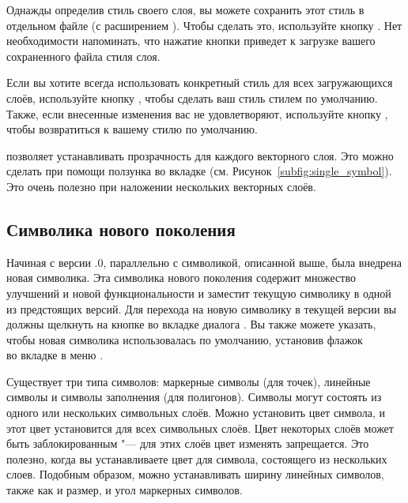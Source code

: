 Однажды определив стиль своего слоя, вы можете сохранить этот стиль в
отдельном файле (с расширением ). Чтобы сделать это,
используйте кнопку . Нет необходимости
напоминать, что нажатие кнопки  приведет к
загрузке вашего сохраненного файла стиля слоя.

Если вы хотите всегда использовать конкретный стиль для всех загружающихся
слоёв, используйте кнопку ,
чтобы сделать ваш стиль стилем по умолчанию. Также, если внесенные изменения
вас не удовлетворяют, используйте кнопку ,
чтобы возвратиться к вашему стилю по умолчанию.

 \label{sec:vect_transparency}

\qg позволяет устанавливать прозрачность для каждого векторного слоя. Это
можно сделать при помощи ползунка  во вкладке 
(см. Рисунок~\ref{subfig:single_symbol}). Это очень полезно при наложении
нескольких векторных слоёв.

\subsection{Символика нового поколения}

Начиная с версии .0, параллельно с символикой, описанной выше, была
внедрена новая символика. Эта символика нового поколения содержит множество
улучшений и новой функциональности и заместит текущую символику в одной из
предстоящих версий. Для перехода на новую символику в текущей версии вы
должны щелкнуть на кнопке  во вкладке 
диалога . Вы также можете указать, чтобы новая символика
использовалась по умолчанию, установив флажок \\
 во вкладке
 в меню  \arrow {}.


Существует три типа символов: маркерные символы (для точек), линейные символы
и символы заполнения (для полигонов). Символы могут состоять из одного или
нескольких символьных слоёв. Можно установить цвет символа, и этот цвет
установится для всех символьных слоёв. Цвет некоторых слоёв может быть
заблокированным "--- для этих слоёв цвет изменять запрещается. Это полезно,
когда вы устанавливаете цвет для символа, состоящего из нескольких слоев.
Подобным образом, можно устанавливать ширину линейных символов, также как
и размер, и угол маркерных символов.

